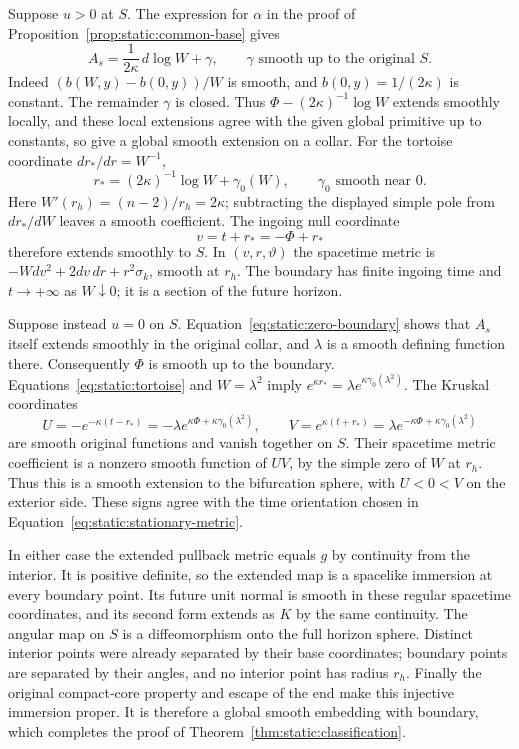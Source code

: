 Suppose $u>0$ at $S$.  The expression for $\alpha$ in the proof
of Proposition~\ref{prop:static:common-base} gives
\begin{equation}\label{eq:static:log-primitive}
 A_s=\frac1{2\kappa}\,d\log W+\gamma,
 \qquad \gamma\text{ smooth up to the original }S.
\end{equation}
Indeed $(b(W,y)-b(0,y))/W$ is smooth, and
$b(0,y)=1/(2\kappa)$ is constant.  The remainder $\gamma$
is closed.  Thus
$\Phi-(2\kappa)^{-1}\log W$ extends smoothly locally, and
these local extensions agree with the given global primitive
up to constants, so give a global smooth extension on a collar.
For the tortoise coordinate $dr_*/dr=W^{-1}$,
\begin{equation}\label{eq:static:tortoise}
 r_*=(2\kappa)^{-1}\log W+\gamma_0(W),
 \qquad \gamma_0\text{ smooth near }0.
\end{equation}
Here $W'(r_h)=(n-2)/r_h=2\kappa$; subtracting the displayed
simple pole from $dr_*/dW$ leaves a smooth coefficient.
The ingoing null coordinate
\[
 v=t+r_*=-\Phi+r_*
\]
therefore extends smoothly to $S$.  In $(v,r,\vartheta)$ the
spacetime metric is
$-Wdv^2+2dv\,dr+r^2\sigma_k$, smooth at $r_h$.
The boundary has finite ingoing time and $t\to+\infty$ as
$W\downarrow0$; it is a section of the future horizon.

Suppose instead $u=0$ on $S$.  Equation~\eqref{eq:static:zero-boundary}
shows that $A_s$ itself extends smoothly in the original collar,
and $\lambda$ is a smooth defining function there.  Consequently
$\Phi$ is smooth up to the boundary.  Equations~\eqref{eq:static:tortoise}
and $W=\lambda^2$ imply
$e^{\kappa r_*}=\lambda e^{\kappa\gamma_0(\lambda^2)}$.
The Kruskal coordinates
\begin{equation}\label{eq:static:kruskal}
 U=-e^{-\kappa(t-r_*)}
   =-\lambda e^{\kappa\Phi+\kappa\gamma_0(\lambda^2)},\qquad
 V=e^{\kappa(t+r_*)}
   =\lambda e^{-\kappa\Phi+\kappa\gamma_0(\lambda^2)}
\end{equation}
are smooth original functions and vanish together on $S$.
Their spacetime metric coefficient is a nonzero smooth function
of $UV$, by the simple zero of $W$ at $r_h$.
Thus this is a smooth extension to the bifurcation sphere,
with $U<0<V$ on the exterior side.  These signs agree with
the time orientation chosen in
Equation~\eqref{eq:static:stationary-metric}.

In either case the extended pullback metric equals $g$ by
continuity from the interior.  It is positive definite, so the
extended map is a spacelike immersion at every boundary point.
Its future unit normal is smooth in these regular spacetime
coordinates, and its second form extends as $K$ by the same
continuity.  The angular map on $S$ is a diffeomorphism onto
the full horizon sphere.  Distinct interior points were already
separated by their base coordinates; boundary points are
separated by their angles, and no interior point has radius
$r_h$.  Finally the original compact-core property and escape
of the end make this injective immersion proper.  It is
therefore a global smooth embedding with boundary, which
completes the proof of Theorem~\ref{thm:static:classification}.
